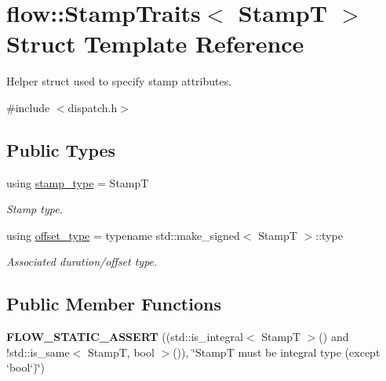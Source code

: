 \hypertarget{structflow_1_1_stamp_traits}{}\section{flow\+:\+:Stamp\+Traits$<$ StampT $>$ Struct Template Reference}
\label{structflow_1_1_stamp_traits}


Helper struct used to specify stamp attributes.  




{\ttfamily \#include $<$dispatch.\+h$>$}

\subsection*{Public Types}
\begin{DoxyCompactItemize}
\item 
\mbox{\label{structflow_1_1_stamp_traits_a69cb61df629f8f0ae9bb483e233b5174}} 
using \hyperlink{structflow_1_1_stamp_traits_a69cb61df629f8f0ae9bb483e233b5174}{stamp\+\_\+type} = StampT
\begin{DoxyCompactList}\small\item\em Stamp type. \end{DoxyCompactList}\item 
\mbox{\label{structflow_1_1_stamp_traits_a82a66329de799814f0ae8eb96749ff80}} 
using \hyperlink{structflow_1_1_stamp_traits_a82a66329de799814f0ae8eb96749ff80}{offset\+\_\+type} = typename std\+::make\+\_\+signed$<$ StampT $>$\+::type
\begin{DoxyCompactList}\small\item\em Associated duration/offset type. \end{DoxyCompactList}\end{DoxyCompactItemize}
\subsection*{Public Member Functions}
\begin{DoxyCompactItemize}
\item 
\mbox{\label{structflow_1_1_stamp_traits_ad0ed216887c84a85ed4a9d7f05cbb4c7}} 
{\bfseries F\+L\+O\+W\+\_\+\+S\+T\+A\+T\+I\+C\+\_\+\+A\+S\+S\+E\+RT} ((std\+::is\+\_\+integral$<$ StampT $>$() and !std\+::is\+\_\+same$<$ StampT, bool $>$()), \char`\"{}\textquotesingle{}StampT\textquotesingle{} must be integral type (except `bool`)\char`\"{})
\end{DoxyCompactItemize}
